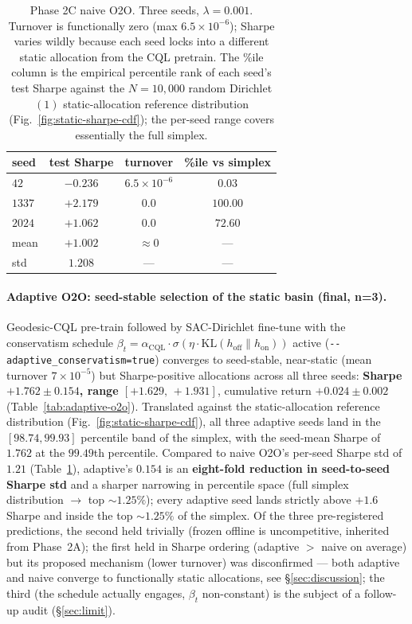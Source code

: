 \begin{table}[t]
\centering
\caption{Phase 2C naive O2O. Three seeds, $\lambda{=}0.001$. Turnover
is functionally zero (max $6.5\!\times\!10^{-6}$); Sharpe varies wildly
because each seed locks into a different static allocation from the
CQL pretrain. The \%ile column is the empirical percentile rank of
each seed's test Sharpe against the $N{=}10{,}000$ random Dirichlet$(1)$
static-allocation reference distribution
(Fig.~\ref{fig:static-sharpe-cdf}); the per-seed range covers
essentially the full simplex.}
\label{tab:naive-o2o}
\small
\begin{tabular}{lccc}
\toprule
seed   & test Sharpe & turnover               & \%ile vs simplex \\
\midrule
$42$   & $-0.236$    & $6.5\!\times\!10^{-6}$ & $0.03$           \\
$1337$ & $+2.179$    & $0.0$                  & $100.00$         \\
$2024$ & $+1.062$    & $0.0$                  & $72.60$          \\
\midrule
mean   & $+1.002$    & $\approx 0$            & ---              \\
std    & $1.208$     & ---                    & ---              \\
\bottomrule
\end{tabular}
\end{table}

\paragraph{Adaptive O2O: seed-stable selection of the static basin
(final, n=3).} Geodesic-CQL pre-train followed by SAC-Dirichlet
fine-tune with the conservatism schedule
$\beta_t = \alpha_{\mathrm{CQL}} \cdot \sigma(\eta \cdot
\mathrm{KL}(h_{\mathrm{off}} \| h_{\mathrm{on}}))$ active
(\texttt{-{}-adaptive\_conservatism=true}) converges to seed-stable,
near-static (mean turnover $7\!\times\!10^{-5}$) but Sharpe-positive
allocations across all three seeds: \textbf{Sharpe $+1.762 \pm 0.154$,
range $[+1.629,\,+1.931]$}, cumulative return $+0.024 \pm 0.002$
(Table~\ref{tab:adaptive-o2o}). Translated against the
static-allocation reference distribution
(Fig.~\ref{fig:static-sharpe-cdf}), all three adaptive seeds land in
the $[98.74, 99.93]$ percentile band of the simplex, with the
seed-mean Sharpe of $1.762$ at the $99.49$th percentile. Compared
to naive O2O's per-seed Sharpe std of $1.21$
(Table~\ref{tab:naive-o2o}), adaptive's $0.154$ is an
\textbf{eight-fold reduction in seed-to-seed Sharpe std} and a
sharper narrowing in percentile space (full simplex distribution
$\rightarrow$ top $\sim\!1.25\%$); every adaptive seed lands strictly
above $+1.6$ Sharpe and inside the top $\sim\!1.25\%$ of the simplex.
Of the three pre-registered predictions, the second held trivially
(frozen offline is uncompetitive, inherited from Phase~2A); the first
held in Sharpe ordering (adaptive $>$ naive on average) but its
proposed mechanism (lower turnover) was disconfirmed --- both
adaptive and naive converge to functionally static allocations, see
\S\ref{sec:discussion}; the third (the schedule actually engages,
$\beta_t$ non-constant) is the subject of a follow-up audit
(\S\ref{sec:limit}).

